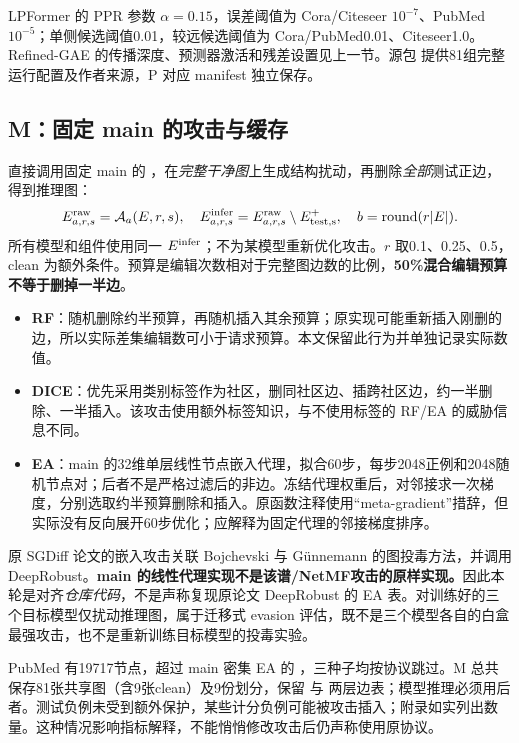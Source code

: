 LPFormer 的 PPR 参数 $\alpha=0.15$，误差阈值为 Cora/Citeseer $10^{-7}$、PubMed $10^{-5}$；单侧候选阈值0.01，较远候选阈值为 Cora/PubMed0.01、Citeseer1.0。Refined-GAE 的传播深度、预测器激活和残差设置见上一节。源包  提供81组完整运行配置及作者来源，P 对应 manifest 独立保存。

\subsection{M：固定 main 的攻击与缓存}
直接调用固定 main 的 ，在\emph{完整干净图}上生成结构扰动，再删除\emph{全部}测试正边，得到推理图：
\begin{equation}
 E^{\rm raw}_{a,r,s}=\mathcal A_a(E,r,s),\quad
 E^{\rm infer}_{a,r,s}=E^{\rm raw}_{a,r,s}\setminus E^{+}_{\rm test,s},\quad
 b=\operatorname{round}(r|E|).
\end{equation}
所有模型和组件使用同一 $E^{\rm infer}$；不为某模型重新优化攻击。$r$ 取0.1、0.25、0.5，clean 为额外条件。预算是编辑次数相对于完整图边数的比例，\textbf{50\%混合编辑预算不等于删掉一半边}。
\begin{itemize}
\item \textbf{RF}：随机删除约半预算，再随机插入其余预算；原实现可能重新插入刚删的边，所以实际差集编辑数可小于请求预算。本文保留此行为并单独记录实际数值。
\item \textbf{DICE}：优先采用类别标签作为社区，删同社区边、插跨社区边，约一半删除、一半插入。该攻击使用额外标签知识，与不使用标签的 RF/EA 的威胁信息不同。
\item \textbf{EA}：main 的32维单层线性节点嵌入代理，拟合60步，每步2048正例和2048随机节点对；后者不是严格过滤后的非边。冻结代理权重后，对邻接求一次梯度，分别选取约半预算删除和插入。原函数注释使用“meta-gradient”措辞，但实际没有反向展开60步优化；应解释为固定代理的邻接梯度排序。
\end{itemize}
原 SGDiff 论文的嵌入攻击关联 Bojchevski 与 G\"unnemann 的图投毒方法，并调用 DeepRobust\cite{bojchevski2019attack,li2020deeprobust}。\textbf{main 的线性代理实现不是该谱/NetMF攻击的原样实现。}因此本轮是对齐\emph{仓库代码}，不是声称复现原论文 DeepRobust 的 EA 表。对训练好的三个目标模型仅扰动推理图，属于迁移式 evasion 评估，既不是三个模型各自的白盒最强攻击，也不是重新训练目标模型的投毒实验。

PubMed 有19717节点，超过 main 密集 EA 的 ，三种子均按协议跳过。M 总共保存81张共享图（含9张clean）及9份划分，保留  与  两层边表；模型推理必须用后者。测试负例未受到额外保护，某些计分负例可能被攻击插入；附录如实列出数量。这种情况影响指标解释，不能悄悄修改攻击后仍声称使用原协议。

